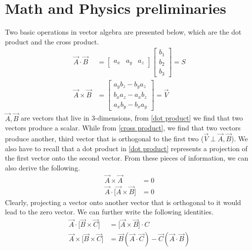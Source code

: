 \section{Math and Physics preliminaries} 
Two basic operations in vector algebra are presented below, which are the dot product and the cross product. 
\begin{align}
	\label{dot product}
	\vec{A} \cdot \vec{B} &= 
		\begin{bmatrix}
			a_{x} & a_{y} & a_{z}
		\end{bmatrix} 
		\begin{bmatrix}
			b_{1}\\
			b_{2}\\
			b_{3}
		\end{bmatrix} = S\\	
	\label{cross product}
	\vec{A} \times \vec{B} &= 
		\begin{bmatrix}
			a_{y}b_{z} - b_{y}a_{z}\\
			b_{x}a_{z} - a_{x}b_{z}\\
			a_{x}b_{y} - b_{x}a_{y}
		\end{bmatrix} = \vec{V} 
\end{align}	
$\vec{A}, \vec{B}$ are vectors that live in 3-dimensions, from \autoref{dot product} we find that two vectors produce a scalar. While from \autoref{cross product}, we find that two vectors produce another, third vector that is orthogonal to the first two ($\vec{V} \perp \vec{A}, \vec{B}$). We also have to recall that a dot product in \autoref{dot product} represents a projection of the first vector onto the second vector. From these pieces of information, we can also derive the following. 
\begin{align}
	\label{cross cross} 
	\vec{A} \times \vec{A} &= 0\\
	\label{dot cross}
	\vec{A} \cdot \Big[ \vec{A} \times \vec{B} \Big] &= 0
\end{align}
Clearly, projecting a vector onto another vector that is orthogonal to it would lead to the zero vector. We can further write the following identities. 
\begin{align}
	\vec{A} \cdot \Big[ \vec{B} \times \vec{C} \Big] &= \Big[\vec{A} \times \vec{B} \Big] \cdot C\\
	\vec{A} \times \Big[\vec{B} \times \vec{C} \Big] &= \vec{B}(\vec{A} \cdot \vec{C}) - \vec{C}(\vec{A} \cdot \vec{B})
\end{align} 
